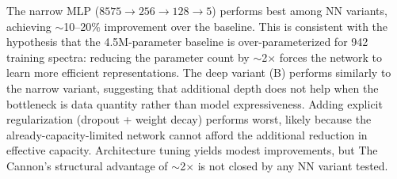 \documentclass[10pt,preprint2]{aastex}
\begin{document}
The narrow MLP ($8575 \to 256 \to 128 \to 5$) performs best among NN variants, achieving $\sim$10--20\% improvement over the baseline. This is consistent with the hypothesis that the 4.5M-parameter baseline is over-parameterized for 942 training spectra: reducing the parameter count by $\sim$2$\times$ forces the network to learn more efficient representations. The deep variant (B) performs similarly to the narrow variant, suggesting that additional depth does not help when the bottleneck is data quantity rather than model expressiveness. Adding explicit regularization (dropout + weight decay) performs worst, likely because the already-capacity-limited network cannot afford the additional reduction in effective capacity. Architecture tuning yields modest improvements, but The Cannon's structural advantage of $\sim$2$\times$ is not closed by any NN variant tested.


\end{document}
